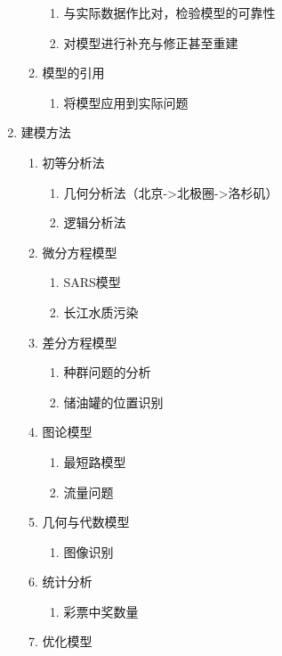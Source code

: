 \begin{enumerate}
\begin{enumerate}
        \begin{enumerate}
        \item 与实际数据作比对，检验模型的可靠性
        \item 对模型进行补充与修正甚至重建
        \end{enumerate}
    \item 模型的引用
        \begin{enumerate}
        \item 将模型应用到实际问题
        \end{enumerate}
    \end{enumerate}
\item 建模方法
    \begin{enumerate}
    \item 初等分析法
        \begin{enumerate}
        \item 几何分析法（北京->北极圈->洛杉矶）
        \item 逻辑分析法
        \end{enumerate}
    \item 微分方程模型
        \begin{enumerate}
        \item SARS模型
        \item 长江水质污染
        \end{enumerate}
    \item 差分方程模型
        \begin{enumerate}
        \item 种群问题的分析
        \item 储油罐的位置识别
        \end{enumerate}
    \item 图论模型
        \begin{enumerate}
        \item 最短路模型
        \item 流量问题
        \end{enumerate}
    \item 几何与代数模型
        \begin{enumerate}
        \item 图像识别
        \end{enumerate}
    \item 统计分析
        \begin{enumerate}
        \item 彩票中奖数量
        \end{enumerate}
    \item 优化模型

\end{enumerate}
\end{enumerate}
